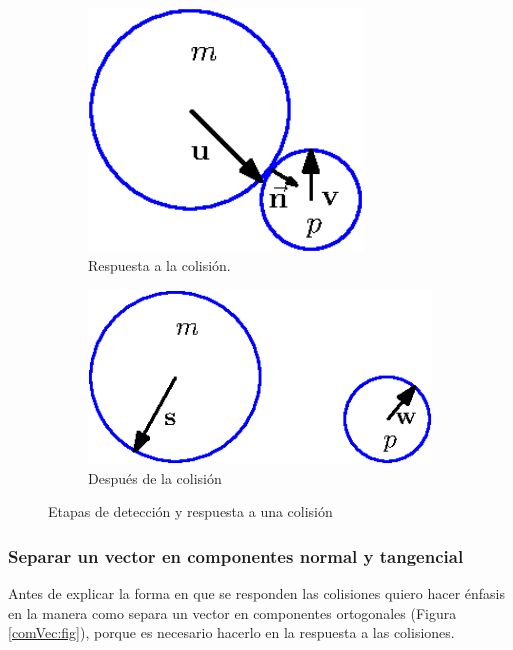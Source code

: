 \begin{figure}
\\
\vspace{1cm}
  \begin{subfigure}[b]{0.32\textwidth}
    \includegraphics[width=0.8\textwidth]{Img/02/colisionesResponde}
    \caption{Respuesta a la colisión.}
    \label{fig:coliResponde}
  \end{subfigure}
  \hspace{2cm}
  \begin{subfigure}[b]{0.32\textwidth}
    \includegraphics[width=1.1\textwidth]{Img/02/colisionesAjusta}
    \caption{Después de la colisión}
    \label{fig:coliAjusta}
  \end{subfigure}
 \caption[Colisión elástica]{Etapas de detección y respuesta a una colisión} 
 \label{colision:fig}
\end{figure}

\subsubsection{Separar un vector en componentes normal y tangencial}
Antes de explicar la forma en que se responden las colisiones quiero hacer énfasis en la manera como separa un vector en componentes ortogonales (Figura \ref{comVec:fig}), porque es necesario hacerlo en la respuesta a las colisiones.

